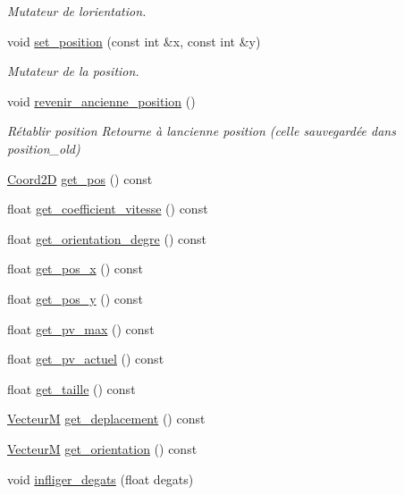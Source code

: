 \begin{DoxyCompactItemize}
\begin{DoxyCompactList}\small\item\em Mutateur de l\textquotesingle{}orientation. \end{DoxyCompactList}\item 
void \hyperlink{classPerso_a61086cee36d4adf7f95b6eab8c2a0016}{set\+\_\+position} (const int \&x, const int \&y)
\begin{DoxyCompactList}\small\item\em Mutateur de la position. \end{DoxyCompactList}\item 
void \hyperlink{classPerso_a7ccf761bd7df818e304713fe117ec4d1}{revenir\+\_\+ancienne\+\_\+position} ()
\begin{DoxyCompactList}\small\item\em Rétablir position Retourne à l\textquotesingle{}ancienne position (celle sauvegardée dans position\+\_\+old) \end{DoxyCompactList}\item 
\hyperlink{classCoord2D}{Coord2D} \hyperlink{classPerso_a5190c85261ab0e6f5825b1a5d23042f7}{get\+\_\+pos} () const 
\item 
float \hyperlink{classPerso_aa8d8bea99ce43e44a071e0d773356fd2}{get\+\_\+coefficient\+\_\+vitesse} () const 
\item 
float \hyperlink{classPerso_a681288fec10d471d95374488c63b9a77}{get\+\_\+orientation\+\_\+degre} () const 
\item 
float \hyperlink{classPerso_ab03b733beb68cf443e281ee1272b56df}{get\+\_\+pos\+\_\+x} () const 
\item 
float \hyperlink{classPerso_a3c38e53fa260249c5b97bd0926442958}{get\+\_\+pos\+\_\+y} () const 
\item 
float \hyperlink{classPerso_a5a56b6db9d25cf6c34ebb16d31a0b7a5}{get\+\_\+pv\+\_\+max} () const 
\item 
float \hyperlink{classPerso_aa7ca3080d319f62908c10f777fe93811}{get\+\_\+pv\+\_\+actuel} () const 
\item 
float \hyperlink{classPerso_a37f3623645e49fd9408a350f75eac62f}{get\+\_\+taille} () const 
\item 
\hyperlink{classVecteurM}{VecteurM} \hyperlink{classPerso_a39dfcd62e64dde90953ac3fe3aa7d53d}{get\+\_\+deplacement} () const 
\item 
\hyperlink{classVecteurM}{VecteurM} \hyperlink{classPerso_a7092b7aef8e99d900db50114d55cab2b}{get\+\_\+orientation} () const 
\item 
void \hyperlink{classPerso_aa090d23e55bbbda0cf572d9cbdb294e6}{infliger\+\_\+degats} (float degats)

\end{DoxyCompactItemize}
